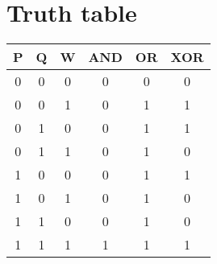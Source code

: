 \section{Truth table}
\begin{center}
  \begin{tabular}{|c c c | c | c | c|}
    \hline
    \textbf{P} & \textbf{Q} & \textbf{W} & \textbf{AND} & \textbf{OR} & \textbf{XOR} \\ %
    \hline %
    0 & 0 & 0 & 0 & 0 & 0 \\
    0 & 0 & 1 & 0 & 1 & 1 \\
    0 & 1 & 0 & 0 & 1 & 1 \\
    0 & 1 & 1 & 0 & 1 & 0 \\
    1 & 0 & 0 & 0 & 1 & 1 \\
    1 & 0 & 1 & 0 & 1 & 0 \\
    1 & 1 & 0 & 0 & 1 & 0 \\
    1 & 1 & 1 & 1 & 1 & 1 \\
    \hline
  \end{tabular}
\end{center}
